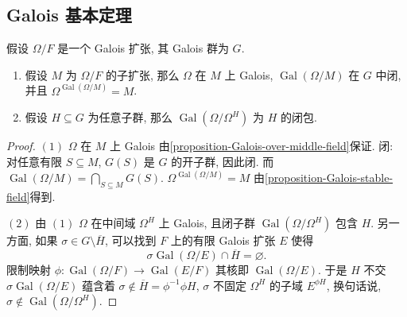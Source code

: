 \subsection{Galois 基本定理}

\begin{proposition}
  假设 \( \Omega/F \) 是一个 Galois 扩张, 其 Galois 群为 \( G \).
  \begin{enumerate}
    \item 假设 \( M \) 为 \( \Omega / F \) 的子扩张, 那么 \( \Omega \) 在 \( M
      \) 上 Galois, \( \operatorname{Gal}(\Omega/M) \) 在 \( G \) 中闭, 并且 \(
      \Omega^{\operatorname{Gal}(\Omega/M)} = M \).
    \item 假设 \( H \subseteq G \) 为任意子群, 那么 \(
      \operatorname{Gal}(\Omega/\Omega^H) \) 为 \( H \) 的闭包.
  \end{enumerate}
\end{proposition}
\begin{proof}
  \( (1) \) \( \Omega \) 在 \( M \) 上 Galois
  由\cref{proposition-Galois-over-middle-field}保证.
  闭: 对任意有限 \( S \subseteq M \), \( G(S) \) 是 \( G \) 的开子群, 因此闭.
  而 \( \operatorname{Gal}(\Omega/M) = \bigcap_{S \subseteq M} G(S) \).
  \( \Omega^{\operatorname{Gal}(\Omega/M)} = M \)
  由\cref{proposition-Galois-stable-field}得到.

  \( (2) \) 由 \( (1) \) \( \Omega \) 在中间域 \( \Omega^H \) 上 Galois,
  且闭子群 \( \operatorname{Gal}(\Omega/\Omega^H) \) 包含 \( H \).
  另一方面, 如果 \( \sigma \in G \setminus \overline{H} \), 可以找到 \( F \)
  上的有限 Galois 扩张 \( E \) 使得
  \[
    \sigma \operatorname{Gal}(\Omega/E) \cap \overline{H} = \varnothing.
  \]
  限制映射 \( \phi: \operatorname{Gal}(\Omega/F) \to \operatorname{Gal}(E/F)
  \) 其核即 \( \operatorname{Gal}(\Omega/E) \).
  于是 \( H \) 不交 \( \sigma \operatorname{Gal}(\Omega/E) \) 蕴含着 \( \sigma
  \notin \overline{H} = \phi^{-1} \phi H \), \( \sigma \) 不固定 \( \Omega^H \)
  的子域 \( E^{\phi H} \), 换句话说, \( \sigma \notin \operatorname{Gal}(\Omega/
  \Omega^H) \).
\end{proof}

